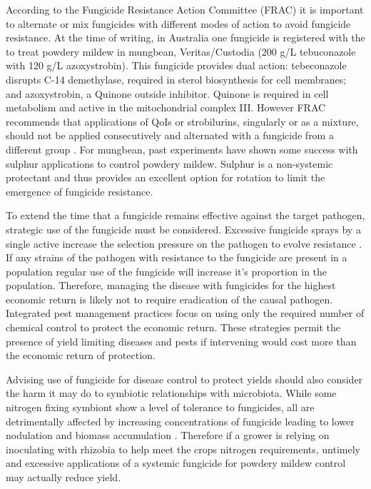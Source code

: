 \documentclass[agronomy,article,submit,moreauthors,pdftex]{mdpi}
\begin{document}
According to the Fungicide Resistance Action Committee (FRAC) it is
important to alternate or mix fungicides with different modes of action
to avoid fungicide resistance. At the time of writing, in Australia one
fungicide is registered with the to treat powdery mildew in mungbean,
Veritas/Custodia (200 g/L tebuconazole with 120 g/L azoxystrobin). This
fungicide provides dual action: tebeconazole disrupts C-14 demethylase,
required in sterol biosynthesis for cell membranes; and azoxystrobin, a
Quinone outside inhibitor. Quinone is required in cell metabolism and
active in the mitochondrial complex III. However FRAC recommends that
applications of QoIs or strobilurins, singularly or as a mixture, should
not be applied consecutively and alternated with a fungicide from a
different group \citep{Brent2007}. For mungbean, past experiments have
shown some success with sulphur applications to control powdery mildew.
Sulphur is a non-systemic protectant and thus provides an excellent
option for rotation to limit the emergence of fungicide resistance.

To extend the time that a fungicide remains effective against the target
pathogen, strategic use of the fungicide must be considered. Excessive
fungicide sprays by a single active increase the selection pressure on
the pathogen to evolve resistance \citep{Brent2007}. If any strains of
the pathogen with resistance to the fungicide are present in a
population regular use of the fungicide will increase it's proportion in
the population. Therefore, managing the disease with fungicides for the
highest economic return is likely not to require eradication of the
causal pathogen. Integrated pest management practices focus on using
only the required number of chemical control to protect the economic
return. These strategies permit the presence of yield limiting diseases
and pests if intervening would cost more than the economic return of
protection.

Advising use of fungicide for disease control to protect yields should
also consider the harm it may do to symbiotic relationships with
microbiota. While some nitrogen fixing symbiont show a level of
tolerance to fungicides, all are detrimentally affected by increasing
concentrations of fungicide leading to lower nodulation and biomass
accumulation \citep[\citet{Shahid2019}]{Ahemad2011}. Therefore if a
grower is relying on inoculating with rhizobia to help meet the crops
nitrogen requirements, untimely and excessive applications of a systemic
fungicide for powdery mildew control may actually reduce yield.
\end{document}
